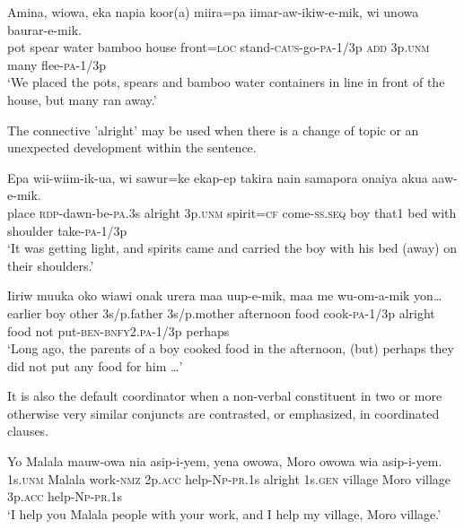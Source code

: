 \ea%
\label{ex:8:x1375}
\gll Amina,  wiowa,  eka  napia  koor(a)  miira=pa iimar-aw-ikiw-e-mik,    wi  unowa  baurar-e-mik. \\
pot  spear  water  bamboo  house  front=\textsc{loc} stand-\textsc{caus}-go-\textsc{pa}-1/3p  \textsc{add}  3p.\textsc{unm}  many  flee-\textsc{pa}-1/3p    \\
\glt`We placed the pots, spears and bamboo water containers in line in front of the house, but many ran away.'
\z


The connective  'alright' may be used when there is a change of topic or an unexpected development within the sentence.

\ea%
\label{ex:8:x1376}
\gll Epa  wii-wiim-ik-ua,    wi  sawur=ke  ekap-ep  takira  nain  samapora  onaiya  akua  aaw-e-mik.\\
place  \textsc{rdp}-dawn-be-\textsc{pa}.3s  alright  3p.\textsc{unm}  spirit=\textsc{cf}  come-\textsc{ss}.\textsc{seq} boy  that1  bed  with  shoulder  take-\textsc{pa}-1/3p    \\
\glt`It was getting light, and spirits came and carried the boy with his bed (away) on their shoulders.'
\z


\ea%
\label{ex:8:x1377}
\gll Iiriw  muuka  oko  wiawi  onak  urera  maa uup-e-mik,    maa  me  wu-om-a-mik  yon{\dots} \\
earlier  boy  other  3s/p.father  3s/p.mother  afternoon  food cook-\textsc{pa}-1/3p  alright  food  not  put-\textsc{ben}-\textsc{bnfy}2.\textsc{pa}-1/3p  perhaps     \\
\glt`Long ago, the parents of a boy cooked food in the afternoon, (but) perhaps they did not put any food for him {\dots}'
\z


It is also the default coordinator when a non-verbal constituent in two or more otherwise very similar conjuncts are contrasted, or emphasized, in coordinated clauses.

\ea%
\label{ex:8:x1379}
\gll Yo  Malala  mauw-owa  nia  asip-i-yem,   yena  owowa,  Moro  owowa  wia  asip-i-yem.\\
1s.\textsc{unm}  Malala  work-\textsc{nmz}  2p.\textsc{acc}  help-\textsc{Np}-\textsc{pr}.1s  alright 1s.\textsc{gen}  village  Moro  village  3p.\textsc{acc}  help-\textsc{Np}-\textsc{pr}.1s     \\
\glt`I help you Malala people with your work, and I help my village, Moro village.'
\z


